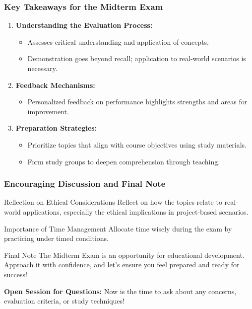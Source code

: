 \documentclass[aspectratio=169]{beamer}
\begin{document}
\begin{frame}[fragile]
    \frametitle{Key Takeaways for the Midterm Exam}
    \begin{enumerate}
        \item \textbf{Understanding the Evaluation Process:}
        \begin{itemize}
            \item Assesses critical understanding and application of concepts.
            \item Demonstration goes beyond recall; application to real-world scenarios is necessary.
        \end{itemize}
        
        \item \textbf{Feedback Mechanisms:}
        \begin{itemize}
            \item Personalized feedback on performance highlights strengths and areas for improvement.
        \end{itemize}
        
        \item \textbf{Preparation Strategies:}
        \begin{itemize}
            \item Prioritize topics that align with course objectives using study materials.
            \item Form study groups to deepen comprehension through teaching.
        \end{itemize}
    \end{enumerate}
\end{frame}

\begin{frame}[fragile]
    \frametitle{Encouraging Discussion and Final Note}
    \begin{block}{Reflection on Ethical Considerations}
        Reflect on how the topics relate to real-world applications, especially the ethical implications in project-based scenarios.
    \end{block}
    
    \begin{block}{Importance of Time Management}
        Allocate time wisely during the exam by practicing under timed conditions.
    \end{block}
    
    \begin{block}{Final Note}
        The Midterm Exam is an opportunity for educational development. Approach it with confidence, and let’s ensure you feel prepared and ready for success!
    \end{block}
    
    \textbf{Open Session for Questions:} 
    Now is the time to ask about any concerns, evaluation criteria, or study techniques!
\end{frame}
\end{document}
